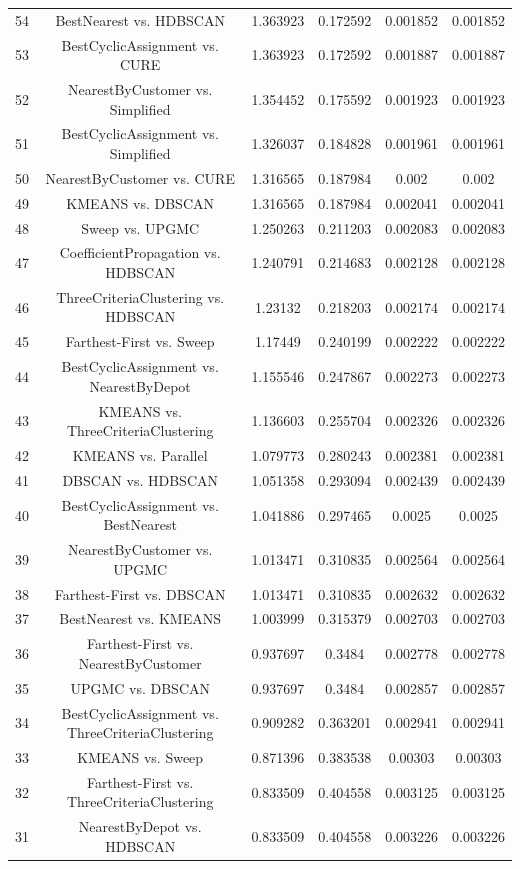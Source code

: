 \documentclass[a4paper,10pt]{article}
\begin{document}
\begin{landscape}
\begin{table}[!htp]
\begin{tabular}{cccccc}
54&BestNearest vs. HDBSCAN&1.363923&0.172592&0.001852&0.001852\\
53&BestCyclicAssignment vs. CURE&1.363923&0.172592&0.001887&0.001887\\
52&NearestByCustomer vs. Simplified&1.354452&0.175592&0.001923&0.001923\\
51&BestCyclicAssignment vs. Simplified&1.326037&0.184828&0.001961&0.001961\\
50&NearestByCustomer vs. CURE&1.316565&0.187984&0.002&0.002\\
49&KMEANS vs. DBSCAN&1.316565&0.187984&0.002041&0.002041\\
48&Sweep vs. UPGMC&1.250263&0.211203&0.002083&0.002083\\
47&CoefficientPropagation vs. HDBSCAN&1.240791&0.214683&0.002128&0.002128\\
46&ThreeCriteriaClustering vs. HDBSCAN&1.23132&0.218203&0.002174&0.002174\\
45&Farthest-First vs. Sweep&1.17449&0.240199&0.002222&0.002222\\
44&BestCyclicAssignment vs. NearestByDepot&1.155546&0.247867&0.002273&0.002273\\
43&KMEANS vs. ThreeCriteriaClustering&1.136603&0.255704&0.002326&0.002326\\
42&KMEANS vs. Parallel&1.079773&0.280243&0.002381&0.002381\\
41&DBSCAN vs. HDBSCAN&1.051358&0.293094&0.002439&0.002439\\
40&BestCyclicAssignment vs. BestNearest&1.041886&0.297465&0.0025&0.0025\\
39&NearestByCustomer vs. UPGMC&1.013471&0.310835&0.002564&0.002564\\
38&Farthest-First vs. DBSCAN&1.013471&0.310835&0.002632&0.002632\\
37&BestNearest vs. KMEANS&1.003999&0.315379&0.002703&0.002703\\
36&Farthest-First vs. NearestByCustomer&0.937697&0.3484&0.002778&0.002778\\
35&UPGMC vs. DBSCAN&0.937697&0.3484&0.002857&0.002857\\
34&BestCyclicAssignment vs. ThreeCriteriaClustering&0.909282&0.363201&0.002941&0.002941\\
33&KMEANS vs. Sweep&0.871396&0.383538&0.00303&0.00303\\
32&Farthest-First vs. ThreeCriteriaClustering&0.833509&0.404558&0.003125&0.003125\\
31&NearestByDepot vs. HDBSCAN&0.833509&0.404558&0.003226&0.003226\\

\end{tabular}
\end{table}
\end{landscape}
\end{document}
